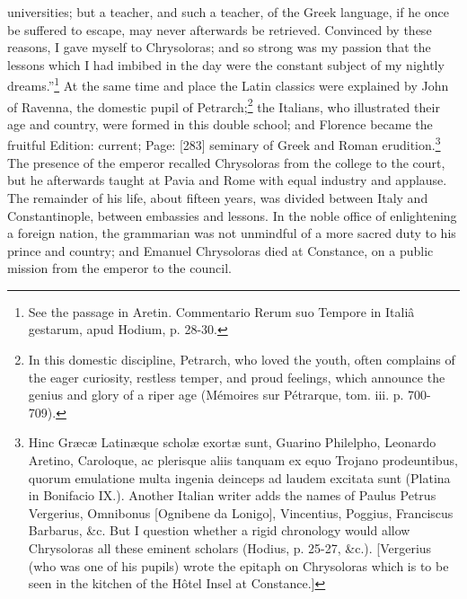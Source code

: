 universities; but a teacher, and such a teacher, of the Greek language, if he once be suffered to escape, may never afterwards be retrieved. Convinced by these reasons, I gave myself to Chrysoloras; and so strong was my passion that the lessons which I had imbibed in the day were the constant subject of my nightly dreams.\texthebrew{}”\footnote{See the passage in Aretin. Commentario Rerum suo Tempore in Italiâ gestarum, apud Hodium, p. 28-30.} At the same time and place the Latin classics were explained by John of Ravenna, the domestic pupil of Petrarch;\footnote{In this domestic discipline, Petrarch, who loved the youth, often complains of the eager curiosity, restless temper, and proud feelings, which announce the genius and glory of a riper age (Mémoires sur Pétrarque, tom. iii. p. 700-709).} the Italians, who illustrated their age and country, were formed in this double school; and Florence became the fruitful Edition: current; Page: [283] seminary of Greek and Roman erudition.\footnote{Hinc Græcæ Latinæque scholæ exortæ sunt, Guarino Philelpho, Leonardo Aretino, Caroloque, ac plerisque aliis tanquam ex equo Trojano prodeuntibus, quorum emulatione multa ingenia deinceps ad laudem excitata sunt (Platina in Bonifacio IX.). Another Italian writer adds the names of Paulus Petrus Vergerius, Omnibonus [Ognibene da Lonigo], Vincentius, Poggius, Franciscus Barbarus, \&c. But I question whether a rigid chronology would allow Chrysoloras all these eminent scholars (Hodius, p. 25-27, \&c.). [Vergerius (who was one of his pupils) wrote the epitaph on Chrysoloras which is to be seen in the kitchen of the Hôtel Insel at Constance.]} The presence of the emperor recalled Chrysoloras from the college to the court, but he afterwards taught at Pavia and Rome with equal industry and applause. The remainder of his life, about fifteen years, was divided between Italy and Constantinople, between embassies and lessons. In the noble office of enlightening a foreign nation, the grammarian was not unmindful of a more sacred duty to his prince and country; and Emanuel Chrysoloras died at Constance, on a public mission from the emperor to the council.

